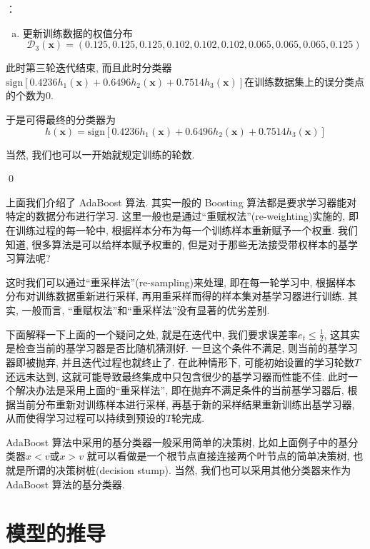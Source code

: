 \documentclass[a4paper,UTF8]{ctexart}
\theoremstyle{plain} \newtheorem{theorem}{定理}[section]
\theoremstyle{plain} \newtheorem{definition}{定义}[section]
\theoremstyle{plain} \newtheorem{lemma}{引理}[section]
\theoremstyle{plain} \newtheorem{proposition}{命题}[section]
\theoremstyle{plain} \newtheorem{example}{例}[section]
\theoremstyle{plain} \newtheorem{remark}{注}[section]
\theoremstyle{plain} \newtheorem{corollary}{推论}[section]
\newenvironment{mysolution}{{\color{blue} 解}： }{{\color{magenta}\qed}}
\begin{document}
\begin{mysolution}
\begin{enumerate}[(a)]
\item 更新训练数据的权值分布
\begin{equation*}
\mathcal{D}_{3}(\bm{x})  = (0.125, 0.125, 0.125, 0.102,0.102, 0.102, 0.065, 0.065, 0.065, 0.125)
\end{equation*}

\end{enumerate}

此时第三轮迭代结束, 而且此时分类器$\mathrm{sign}[0.4236 h_{1}(\bm{x}) + 0.6496 h_{2}(\bm{x}) + 0.7514 h_{3}(\bm{x})]$在训练数据集上的误分类点的个数为$0$. 

于是可得最终的分类器为
\begin{equation*}
h(\bm{x}) = \mathrm{sign}[0.4236 h_{1}(\bm{x}) + 0.6496 h_{2}(\bm{x}) + 0.7514 h_{3}(\bm{x})]
\end{equation*}

当然, 我们也可以一开始就规定训练的轮数.


\end{mysolution}


上面我们介绍了 AdaBoost 算法. 其实一般的 Boosting 算法都是要求学习器能对特定的数据分布进行学习. 这里一般也是通过“重赋权法”(re-weighting)实施的, 即在训练过程的每一轮中, 根据样本分布为每一个训练样本重新赋予一个权重. 我们知道, 很多算法是可以给样本赋予权重的, 但是对于那些无法接受带权样本的基学习算法呢?

这时我们可以通过“重采样法”(re-sampling)来处理, 即在每一轮学习中, 根据样本分布对训练数据重新进行采样, 再用重采样而得的样本集对基学习器进行训练. 其实, 一般而言, “重赋权法”和“重采样法”没有显著的优劣差别.

下面解释一下上面的一个疑问之处, 就是在迭代中, 我们要求误差率$e_{t} \leqslant \frac{1}{2}$, 这其实是检查当前的基学习器是否比随机猜测好. 一旦这个条件不满足, 则当前的基学习器即被抛弃, 并且迭代过程也就终止了. 在此种情形下, 可能初始设置的学习轮数$T$还远未达到, 这就可能导致最终集成中只包含很少的基学习器而性能不佳. 此时一个解决办法是采用上面的“重采样法”, 即在抛弃不满足条件的当前基学习器后, 根据当前分布重新对训练样本进行采样, 再基于新的采样结果重新训练出基学习器, 从而使得学习过程可以持续到预设的$T$轮完成.

AdaBoost 算法中采用的基分类器一般采用简单的决策树, 比如上面例子中的基分类器$x < v$或$x > v$ 就可以看做是一个根节点直接连接两个叶节点的简单决策树, 也就是所谓的决策树桩(decision stump). 当然, 我们也可以采用其他分类器来作为 AdaBoost 算法的基分类器.



\section{模型的推导}
\end{document}
